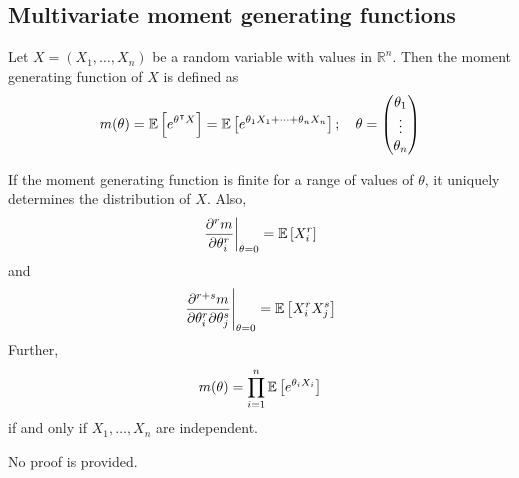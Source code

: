 \subsection{Multivariate moment generating functions}
Let \(X = (X_1, \dots, X_n)\) be a random variable with values in \(\mathbb R^n\).
Then the moment generating function of \(X\) is defined as
\[
	m(\theta) = \mathbb{E}\left[{e^{\theta^\intercal X}}\right] = \mathbb{E}\left[{e^{\theta_1 X_1 + \dots + \theta_n X_n}}\right];\quad \theta = \begin{pmatrix}
		\theta_1 \\ \vdots \\ \theta_n
	\end{pmatrix}
\]
\begin{theorem}
	If the moment generating function is finite for a range of values of \(\theta\), it uniquely determines the distribution of \(X\).
	Also,
	\[
		\eval{\pdv[r]{m}{\theta_i}}_{\theta = 0} = \expect{X_i^r}
	\]
	and
	\[
		\eval{\frac{\partial^{r+s}m}{\partial \theta_i^r \partial \theta_j^s}}_{\theta = 0} = \expect{X_i^r X_j^s}
	\]
	Further,
	\[
		m(\theta) = \prod_{i = 1}^n \mathbb{E}\left[{e^{\theta_i X_i}}\right]
	\]
	if and only if \(X_1, \dots, X_n\) are independent.
\end{theorem}
No proof is provided.
